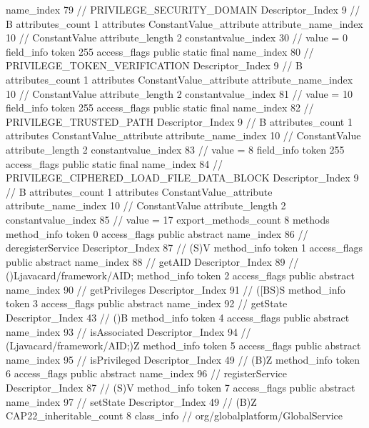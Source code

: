 {{{{{				name_index	79		// PRIVILEGE_SECURITY_DOMAIN
				Descriptor_Index	9		// B
				attributes_count	1
				attributes {
				ConstantValue_attribute {
					attribute_name_index	10		// ConstantValue
					attribute_length	2
					constantvalue_index	30		// value = 0
				}
				}
			}
			field_info {
				token	255
				access_flags	public static final
				name_index	80		// PRIVILEGE_TOKEN_VERIFICATION
				Descriptor_Index	9		// B
				attributes_count	1
				attributes {
				ConstantValue_attribute {
					attribute_name_index	10		// ConstantValue
					attribute_length	2
					constantvalue_index	81		// value = 10
				}
				}
			}
			field_info {
				token	255
				access_flags	public static final
				name_index	82		// PRIVILEGE_TRUSTED_PATH
				Descriptor_Index	9		// B
				attributes_count	1
				attributes {
				ConstantValue_attribute {
					attribute_name_index	10		// ConstantValue
					attribute_length	2
					constantvalue_index	83		// value = 8
				}
				}
			}
			field_info {
				token	255
				access_flags	public static final
				name_index	84		// PRIVILEGE_CIPHERED_LOAD_FILE_DATA_BLOCK
				Descriptor_Index	9		// B
				attributes_count	1
				attributes {
				ConstantValue_attribute {
					attribute_name_index	10		// ConstantValue
					attribute_length	2
					constantvalue_index	85		// value = 17
				}
				}
			}
			}
			export_methods_count	8
			methods {
				method_info {
					token	0
					access_flags	public abstract
					name_index	86		// deregisterService
					Descriptor_Index	87		// (S)V
				}
				method_info {
					token	1
					access_flags	public abstract
					name_index	88		// getAID
					Descriptor_Index	89		// ()Ljavacard/framework/AID;
				}
				method_info {
					token	2
					access_flags	public abstract
					name_index	90		// getPrivileges
					Descriptor_Index	91		// ([BS)S
				}
				method_info {
					token	3
					access_flags	public abstract
					name_index	92		// getState
					Descriptor_Index	43		// ()B
				}
				method_info {
					token	4
					access_flags	public abstract
					name_index	93		// isAssociated
					Descriptor_Index	94		// (Ljavacard/framework/AID;)Z
				}
				method_info {
					token	5
					access_flags	public abstract
					name_index	95		// isPrivileged
					Descriptor_Index	49		// (B)Z
				}
				method_info {
					token	6
					access_flags	public abstract
					name_index	96		// registerService
					Descriptor_Index	87		// (S)V
				}
				method_info {
					token	7
					access_flags	public abstract
					name_index	97		// setState
					Descriptor_Index	49		// (B)Z
				}
			}
			CAP22_inheritable_count	8
		}
		class_info {		// org/globalplatform/GlobalService
}}}
